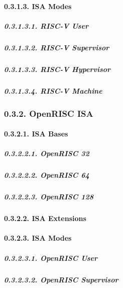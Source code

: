 \documentclass[
]{article}
\begin{document}
\hypertarget{isa-modes-3}{%
\paragraph{0.3.1.3. ISA Modes}\label{isa-modes-3}}

\hypertarget{risc-v-user-1}{%
\subparagraph{0.3.1.3.1. RISC-V User}\label{risc-v-user-1}}

\hypertarget{risc-v-supervisor-1}{%
\subparagraph{0.3.1.3.2. RISC-V Supervisor}\label{risc-v-supervisor-1}}

\hypertarget{risc-v-hypervisor-1}{%
\subparagraph{0.3.1.3.3. RISC-V Hypervisor}\label{risc-v-hypervisor-1}}

\hypertarget{risc-v-machine-1}{%
\subparagraph{0.3.1.3.4. RISC-V Machine}\label{risc-v-machine-1}}

\hypertarget{openrisc-isa-1}{%
\subsubsection{0.3.2. OpenRISC ISA}\label{openrisc-isa-1}}

\hypertarget{isa-bases-4}{%
\paragraph{0.3.2.1. ISA Bases}\label{isa-bases-4}}

\hypertarget{openrisc-32-1}{%
\subparagraph{0.3.2.2.1. OpenRISC 32}\label{openrisc-32-1}}

\hypertarget{openrisc-64-1}{%
\subparagraph{0.3.2.2.2. OpenRISC 64}\label{openrisc-64-1}}

\hypertarget{openrisc-128-1}{%
\subparagraph{0.3.2.2.3. OpenRISC 128}\label{openrisc-128-1}}

\hypertarget{isa-extensions-4}{%
\paragraph{0.3.2.2. ISA Extensions}\label{isa-extensions-4}}

\hypertarget{isa-modes-4}{%
\paragraph{0.3.2.3. ISA Modes}\label{isa-modes-4}}

\hypertarget{openrisc-user-1}{%
\subparagraph{0.3.2.3.1. OpenRISC User}\label{openrisc-user-1}}

\hypertarget{openrisc-supervisor-1}{%
\subparagraph{0.3.2.3.2. OpenRISC
Supervisor}\label{openrisc-supervisor-1}}
\end{document}
